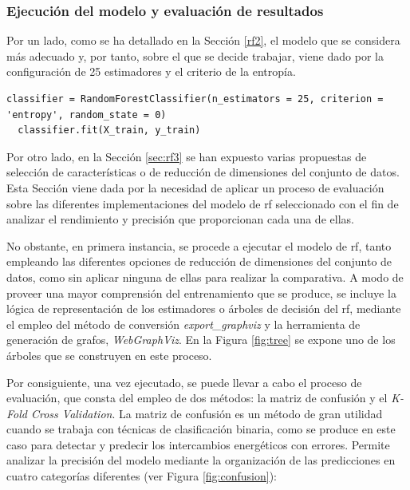 \subsubsection{Ejecución del modelo y evaluación de resultados}
\label{sec:rf4}

Por un lado, como se ha detallado en la Sección \ref{rf2}, el modelo que se considera más adecuado y, por tanto, sobre el que se decide trabajar, viene dado por la configuración de 25 estimadores y el criterio de la entropía.

\vspace{3mm}

\begin{lstlisting}[style=Python, caption={Clasificador RF seleccionado}]
  classifier = RandomForestClassifier(n_estimators = 25, criterion = 'entropy', random_state = 0) 
  classifier.fit(X_train, y_train)
\end{lstlisting}
  
\vspace{3mm}

Por otro lado, en la Sección \ref{sec:rf3} se han expuesto varias propuestas de selección de características o de reducción de dimensiones del conjunto de datos. Esta Sección viene dada por la necesidad de aplicar un proceso de evaluación sobre las diferentes implementaciones del modelo de \gls{rf} seleccionado con el fin de analizar el rendimiento y precisión que proporcionan cada una de ellas. 

\vspace{3mm}

No obstante, en primera instancia, se procede a ejecutar el modelo de \gls{rf}, tanto empleando las diferentes opciones de reducción de dimensiones del conjunto de datos, como sin aplicar ninguna de ellas para realizar la comparativa. A modo de proveer una mayor comprensión del entrenamiento que se produce, se incluye la lógica de representación de los estimadores o árboles de decisión del \gls{rf}, mediante el empleo del método de conversión \textit{export\_graphviz} \cite{graphviz2} y la herramienta de generación de grafos, \textit{WebGraphViz}. En la Figura \ref{fig:tree} se expone uno de los árboles que se construyen en este proceso.

\vspace{3mm}

Por consiguiente, una vez ejecutado, se puede llevar a cabo el proceso de evaluación, que consta del empleo de dos métodos: la matriz de confusión y el \textit{K-Fold Cross Validation}. La matriz de confusión \cite{cm} es un método de gran utilidad cuando se trabaja con técnicas de clasificación binaria, como se produce en este caso para detectar y predecir los intercambios energéticos con errores. Permite analizar la precisión del modelo mediante la organización de las predicciones en cuatro categorías diferentes (ver Figura \ref{fig:confusion}): 

